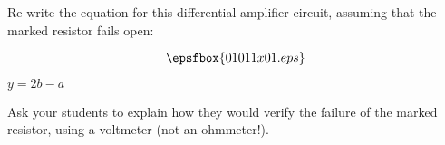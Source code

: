 

Re-write the equation for this differential amplifier circuit, assuming that the marked resistor fails open:

$$\epsfbox{01011x01.eps}$$







$y = 2b - a$







Ask your students to explain how they would verify the failure of the marked resistor, using a voltmeter (not an ohmmeter!).



